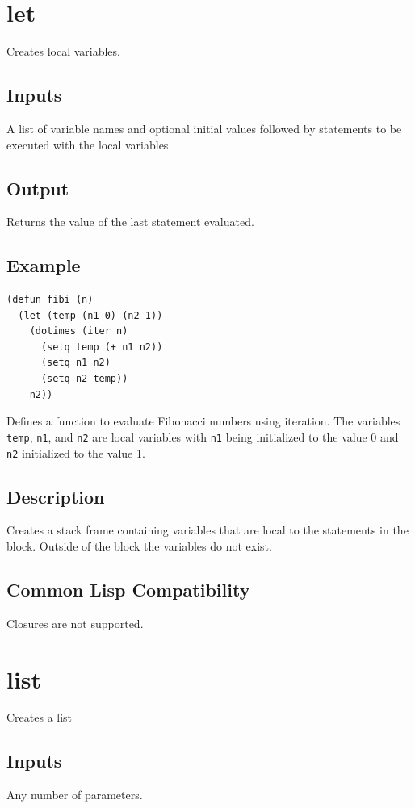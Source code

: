 \documentclass[10pt, openany]{book}
\newcommand{\keyword}[1]{\texttt{#1}}
\begin{document}
\section{let}
Creates local variables.
\subsection{Inputs}
A list of variable names and optional initial values followed by statements to be executed with the local variables.
\subsection{Output}
Returns the value of the last statement evaluated.
\subsection{Example}
\begin{lstlisting}
(defun fibi (n)
  (let (temp (n1 0) (n2 1))
    (dotimes (iter n)
      (setq temp (+ n1 n2))
      (setq n1 n2)
      (setq n2 temp))
    n2))
\end{lstlisting}
Defines a function to evaluate Fibonacci numbers using iteration.  The variables \keyword{temp}, \keyword{n1}, and \keyword{n2} are local variables with \keyword{n1} being initialized to the value 0 and \keyword{n2} initialized to the value 1.
\subsection{Description}
Creates a stack frame containing variables that are local to the statements in the block.  Outside of the block the variables do not exist.
\subsection{Common Lisp Compatibility}
Closures are not supported.

\section{list}
Creates a list
\subsection{Inputs}
Any number of parameters.
\end{document}
